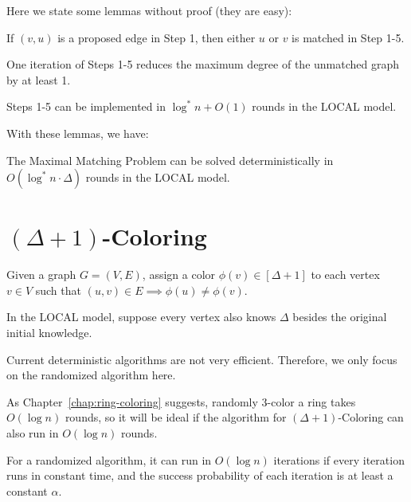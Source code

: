 Here we state some lemmas without proof (they are easy):

\begin{lemma}
	If $(v,u)$ is a proposed edge in Step 1, then either $u$ or $v$ is matched in Step 1-5.
\end{lemma}

\begin{lemma}
	One iteration of Steps 1-5 reduces the maximum degree of the unmatched graph by at least 1.
\end{lemma}

\begin{lemma}
	Steps 1-5 can be implemented in $\log^*n + O(1)$ rounds in the LOCAL model.
\end{lemma}

With these lemmas, we have:

\begin{theorem}
	The Maximal Matching Problem can be solved deterministically in $O(\log^*n\cdot \Delta)$ rounds in the LOCAL model.
\end{theorem}

\chapter{$(\Delta + 1)$-Coloring}

\begin{problem}
Given a graph \( G = (V, E) \), assign a color \( \phi(v) \in [\Delta + 1] \) to each vertex \( v \in V \) such that $(u,v) \in E\implies\phi(u) \neq \phi(v)$.

In the LOCAL model, suppose every vertex also knows $\Delta$ besides the original initial knowledge.
\end{problem}

Current deterministic algorithms are not very efficient. Therefore, we only focus on the randomized algorithm here.

As Chapter~\ref{chap:ring-coloring} suggests, randomly 3-color a ring takes $O(\log n)$ rounds, so it will be ideal if the algorithm for $(\Delta + 1)$-Coloring can also run in $O(\log n)$ rounds.

\begin{remark} \label{rem:rand-algo-logn-iterations}
	For a randomized algorithm, it can run in $O(\log n)$ iterations if every iteration runs in constant time, and the success probability of each iteration is at least a constant $\alpha$.
\end{remark}

